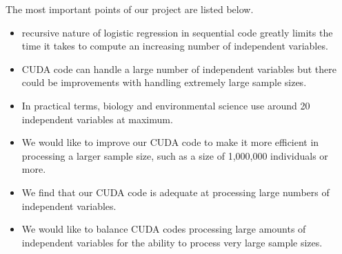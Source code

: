 \documentclass[letterpaper, 10 pt, conference]{ieeeconf}  %
\begin{document}
The most important points of our project are listed below.

\begin{itemize}

\item recursive nature of logistic regression in sequential code greatly limits the time it takes to compute an increasing number of independent variables. 
\item CUDA code can handle a large number of independent variables but there could be improvements with handling extremely large sample sizes.
\item In practical terms, biology and environmental science use around 20 independent variables at maximum.
\item We would like to improve our CUDA code to make it more efficient in processing a larger sample size, such as a size of 1,000,000 individuals or more.
\item We find that our CUDA code is adequate at processing large numbers of independent variables.
\item We would like to balance CUDA codes processing large amounts of independent variables for the ability to process very large sample sizes.
\end{itemize}


\end{document}
